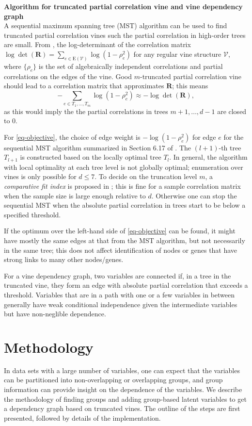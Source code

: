 \documentclass[a4paper]{article}
\def\v{\mathcal{V}}
\def\e{{\mathrm{E}}}
\def\bfr{{\bm{R}}}
\def \det {\operatorname{det}}
\begin{document}
\noindent\textbf{Algorithm for truncated partial correlation vine and vine dependency graph}\\
\indent A sequential maximum spanning tree (MST) algorithm can be used to find
truncated partial correlation vines such the partial correlation in
high-order trees are small.  From \cite{kurowicka2006uncertainty}, the
log-determinant of the correlation matrix
$\log \det (\bfr)=\sum_{e\in \e(\v)}\log (1-\rho_{e}^2)$ for any
regular vine structure $\v$, where $\{\rho_{e}\}$ is the set of
algebraically independent correlations and partial correlations on the
edges of the vine.  Good $m$-truncated partial correlation vine should
lead to a correlation matrix that approximates $\bfr$; this means
\begin{equation}
  \label{eq-objective}
  -\sum_{e\in T_1,\ldots,T_m}\log(1-\rho_{e}^2) \approx -\log\det(\bfr),
\end{equation}
as this would imply the the partial correlations in trees
$m+1,\ldots,d-1$ are closed to 0.

For \eqref{eq-objective}, the choice of edge weight is
$-\log(1-\rho_{e}^2)$ for edge $e$ for the sequential MST algorithm
summarized in Section 6.17 of \cite{Joe2014}.  The $(l+1)$-th tree
$T_{l+1}$ is constructed based on the locally optimal tree $T_{l}$.
In general, the algorithm with local optimality at each tree level is
not globally optimal; enumeration over vines is only possible for
$d\le 7$.  To decide on the truncation level $m$, a
\textit{comparative fit index} is proposed in
\cite{brechmann2015truncation}; this is fine for a sample correlation
matrix when the sample size is large enough relative to $d$.
Otherwise one can stop the sequential MST when the absolute partial
correlation in trees start to be below a specified threshold.

{If the optimum over the left-hand side of \eqref{eq-objective} can be
  found, it might have mostly the same edges at that from the MST
  algorithm, but not necessarily in the same tree; this does not
  affect identification of nodes or genes that have strong links to
  many other nodes/genes.}

For a vine dependency graph, two variables are connected if, in a tree in
the truncated vine, they form an edge with absolute partial correlation
that exceeds a threshold. Variables that are in a path with one or a few
variables in between generally have weak conditional independence given
the intermediate variables but have non-neglible dependence.

\section{Methodology}
\label{sec-method}
In data sets with a large number of variables, one can expect that the
variables can be partitioned into non-overlapping or overlapping
groups, and group information can provide insight on the dependence of
the variables.  We describe the methodology of finding groups and
adding group-based latent variables to get a dependency graph based on
truncated vines.
The outline of the steps are first presented, followed by details of the implementation.
\end{document}
